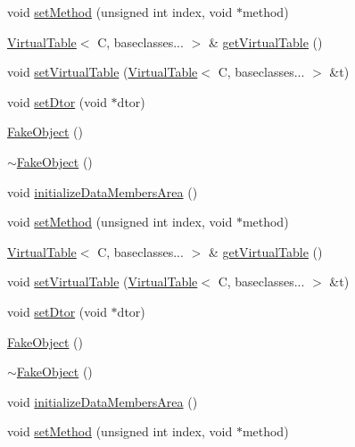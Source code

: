 \begin{DoxyCompactItemize}
void \mbox{\hyperlink{classfakeit_1_1FakeObject_ad05ea03dec6dc302d6d7b62e47bd1219}{set\+Method}} (unsigned int index, void $\ast$method)
\item 
\mbox{\hyperlink{structfakeit_1_1VirtualTable}{Virtual\+Table}}$<$ C, baseclasses... $>$ \& \mbox{\hyperlink{classfakeit_1_1FakeObject_a28a2c51a5eebcb098d63cc0e4afd2a35}{get\+Virtual\+Table}} ()
\item 
void \mbox{\hyperlink{classfakeit_1_1FakeObject_a541dcdf0dd88facbf2025790c41c1964}{set\+Virtual\+Table}} (\mbox{\hyperlink{structfakeit_1_1VirtualTable}{Virtual\+Table}}$<$ C, baseclasses... $>$ \&t)
\item 
void \mbox{\hyperlink{classfakeit_1_1FakeObject_a8045605042e0351da1e5d81288ae46ec}{set\+Dtor}} (void $\ast$dtor)
\item 
\mbox{\hyperlink{classfakeit_1_1FakeObject_ad705c5388b4354d1fdeef0bdd0151167}{Fake\+Object}} ()
\item 
\mbox{\hyperlink{classfakeit_1_1FakeObject_abfc9604c62598655fdefcc98a329dbbf}{$\sim$\+Fake\+Object}} ()
\item 
void \mbox{\hyperlink{classfakeit_1_1FakeObject_a894a7e1ef1e41cec0eb91cbb3d5c73cd}{initialize\+Data\+Members\+Area}} ()
\item 
void \mbox{\hyperlink{classfakeit_1_1FakeObject_ad05ea03dec6dc302d6d7b62e47bd1219}{set\+Method}} (unsigned int index, void $\ast$method)
\item 
\mbox{\hyperlink{structfakeit_1_1VirtualTable}{Virtual\+Table}}$<$ C, baseclasses... $>$ \& \mbox{\hyperlink{classfakeit_1_1FakeObject_a28a2c51a5eebcb098d63cc0e4afd2a35}{get\+Virtual\+Table}} ()
\item 
void \mbox{\hyperlink{classfakeit_1_1FakeObject_a541dcdf0dd88facbf2025790c41c1964}{set\+Virtual\+Table}} (\mbox{\hyperlink{structfakeit_1_1VirtualTable}{Virtual\+Table}}$<$ C, baseclasses... $>$ \&t)
\item 
void \mbox{\hyperlink{classfakeit_1_1FakeObject_a8045605042e0351da1e5d81288ae46ec}{set\+Dtor}} (void $\ast$dtor)
\item 
\mbox{\hyperlink{classfakeit_1_1FakeObject_ad705c5388b4354d1fdeef0bdd0151167}{Fake\+Object}} ()
\item 
\mbox{\hyperlink{classfakeit_1_1FakeObject_abfc9604c62598655fdefcc98a329dbbf}{$\sim$\+Fake\+Object}} ()
\item 
void \mbox{\hyperlink{classfakeit_1_1FakeObject_a894a7e1ef1e41cec0eb91cbb3d5c73cd}{initialize\+Data\+Members\+Area}} ()
\item 
void \mbox{\hyperlink{classfakeit_1_1FakeObject_ad05ea03dec6dc302d6d7b62e47bd1219}{set\+Method}} (unsigned int index, void $\ast$method)

\end{DoxyCompactItemize}
